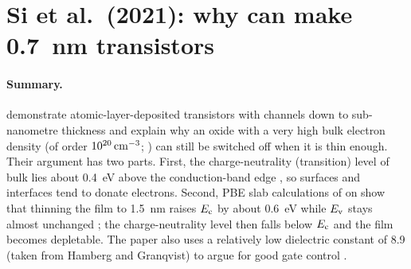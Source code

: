 
\section{Si et al.\ (2021): why \InO{} can make \SI{0.7}{nm} transistors}
\label{sec:lit-si2021}

\paragraph{Summary.}
\citet{Si2021} demonstrate atomic-layer-deposited \InO{} transistors with channels down to
sub-nanometre thickness and explain why an oxide with a very high bulk electron density (of order
$10^{20}\,\mathrm{cm}^{-3}$; \citealp[p.~500]{Si2021}) can still be switched off when it is thin enough. Their
argument has two parts. First, the charge-neutrality (transition) level of bulk \InO{} lies about
\SI{0.4}{eV} above the conduction-band edge \citep[pp.~503--504]{Si2021}, so surfaces and interfaces
tend to donate electrons. Second, PBE slab calculations of \InO{} on \AlO{} show that thinning the film
to \SI{1.5}{nm} raises $E_{\mathrm{c}}$ by about \SI{0.6}{eV} while $E_{\mathrm{v}}$ stays almost unchanged
\citep[p.~504, Fig.~4]{Si2021}; the charge-neutrality level then falls below $E_{\mathrm{c}}$ and the film
becomes depletable. The paper also uses a relatively low \InO{} dielectric constant of 8.9 (taken
from Hamberg and Granqvist) to argue for good gate control \citep[p.~501]{Si2021}.

